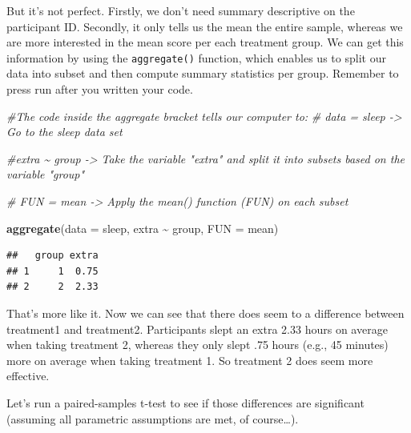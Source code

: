 \documentclass[
]{book}
\newenvironment{Shaded}{\begin{snugshade}}{\end{snugshade}}
\newcommand{\AttributeTok}[1]{\textcolor[rgb]{0.13,0.29,0.53}{#1}}
\newcommand{\CommentTok}[1]{\textcolor[rgb]{0.56,0.35,0.01}{\textit{#1}}}
\newcommand{\ConstantTok}[1]{\textcolor[rgb]{0.56,0.35,0.01}{#1}}
\newcommand{\DecValTok}[1]{\textcolor[rgb]{0.00,0.00,0.81}{#1}}
\newcommand{\FunctionTok}[1]{\textcolor[rgb]{0.13,0.29,0.53}{\textbf{#1}}}
\newcommand{\NormalTok}[1]{#1}
\newcommand{\SpecialCharTok}[1]{\textcolor[rgb]{0.81,0.36,0.00}{\textbf{#1}}}
\begin{document}
But it's not perfect. Firstly, we don't need summary descriptive on the participant ID. Secondly, it only tells us the mean the entire sample, whereas we are more interested in the mean score per each treatment group. We can get this information by using the \texttt{aggregate()} function, which enables us to split our data into subset and then compute summary statistics per group. Remember to press run after you written your code.

\begin{Shaded}
\begin{Highlighting}[]
\CommentTok{\#The code inside the aggregate bracket tells our computer to: }
\CommentTok{\# data = sleep {-}\textgreater{} Go to the sleep data set}

\CommentTok{\#extra \textasciitilde{} group {-}\textgreater{} Take the variable "extra" and split it into subsets based on the variable "group"}

\CommentTok{\# FUN = mean {-}\textgreater{} Apply the mean() function (FUN) on each subset }

\FunctionTok{aggregate}\NormalTok{(}\AttributeTok{data =}\NormalTok{ sleep, extra }\SpecialCharTok{\textasciitilde{}}\NormalTok{ group, }\AttributeTok{FUN =}\NormalTok{ mean)}
\end{Highlighting}
\end{Shaded}

\begin{verbatim}
##   group extra
## 1     1  0.75
## 2     2  2.33
\end{verbatim}

That's more like it. Now we can see that there does seem to a difference between treatment1 and treatment2. Participants slept an extra 2.33 hours on average when taking treatment 2, whereas they only slept .75 hours (e.g., 45 minutes) more on average when taking treatment 1. So treatment 2 does seem more effective.

Let's run a paired-samples t-test to see if those differences are significant (assuming all parametric assumptions are met, of course\ldots).

\begin{Shaded}
\end{Shaded}
\end{document}
